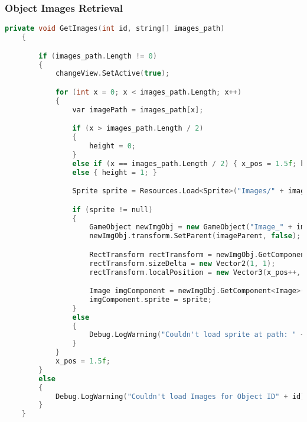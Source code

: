 \subsubsection{Object Images Retrieval}
\begin{lstlisting}[language=C++]
      private void GetImages(int id, string[] images_path)
    {

        if (images_path.Length != 0)
        {
            changeView.SetActive(true);

            for (int x = 0; x < images_path.Length; x++)
            {
                var imagePath = images_path[x];

                if (x > images_path.Length / 2)
                {
                    height = 0;
                }
                else if (x == images_path.Length / 2) { x_pos = 1.5f; height = 0; }
                else { height = 1; }

                Sprite sprite = Resources.Load<Sprite>("Images/" + imagePath);

                if (sprite != null)
                {
                    GameObject newImgObj = new GameObject("Image_" + imagePath, typeof(RectTransform), typeof(CanvasRenderer), typeof(Image));
                    newImgObj.transform.SetParent(imageParent, false);

                    RectTransform rectTransform = newImgObj.GetComponent<RectTransform>();
                    rectTransform.sizeDelta = new Vector2(1, 1);
                    rectTransform.localPosition = new Vector3(x_pos++, height, 0);

                    Image imgComponent = newImgObj.GetComponent<Image>();
                    imgComponent.sprite = sprite;
                }
                else
                {
                    Debug.LogWarning("Couldn't load sprite at path: " + imagePath);
                }
            }
            x_pos = 1.5f;
        }
        else
        {
            Debug.LogWarning("Couldn't load Images for Object ID" + id);
        }
    }
\end{lstlisting}

